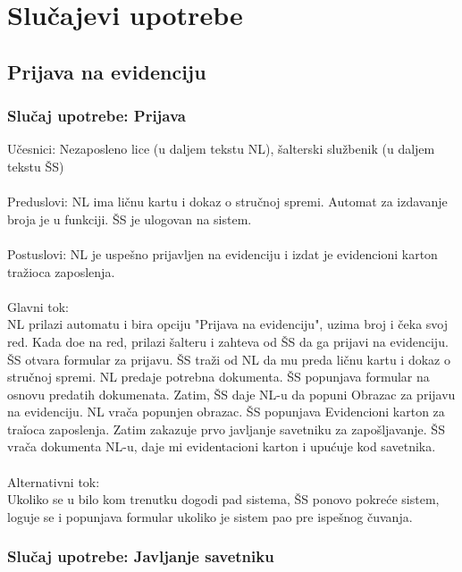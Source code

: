 \section{Slu\v cajevi upotrebe}

\subsection{Prijava na evidenciju}


\subsubsection{Slu\v caj upotrebe: Prijava}

\noindent U\v cesnici: Nezaposleno lice (u daljem tekstu NL), \v salterski slu\v zbenik (u daljem tekstu \v SS)
\\
\\ Preduslovi: NL ima li\v cnu kartu i dokaz o stru\v cnoj spremi. Automat za izdavanje broja je u funkciji. \v SS je ulogovan na sistem. 
\\
\\ Postuslovi: NL je uspe\v sno prijavljen na evidenciju i izdat je evidencioni karton tra\v zioca zaposlenja.
\\
\\ Glavni tok:
\\ NL prilazi automatu i bira opciju "Prijava na evidenciju", uzima broj i \v ceka svoj red. Kada do\dj e na red, prilazi \v salteru i zahteva od \v SS da ga prijavi na evidenciju. \v SS otvara formular za prijavu. \v SS tra\v zi od NL da mu preda li\v cnu kartu i dokaz o stru\v cnoj spremi. NL predaje potrebna dokumenta. \v SS popunjava formular na osnovu predatih dokumenata. Zatim, \v SS daje NL-u da popuni Obrazac za prijavu na evidenciju. NL vra\v ca popunjen obrazac. \v SS popunjava Evidencioni karton za tra\v ioca zaposlenja. Zatim zakazuje prvo javljanje savetniku za zapo\v sljavanje. \v SS vra\v ca dokumenta NL-u, daje mi evidentacioni karton i upu\' cuje kod savetnika.
\\
\\ Alternativni tok: 
\\ Ukoliko se u bilo kom trenutku dogodi pad sistema, \v SS ponovo pokre\'ce sistem, loguje se i popunjava formular ukoliko je sistem pao pre ispe\v snog \v cuvanja.


\subsubsection{Slu\v caj upotrebe: Javljanje savetniku}

